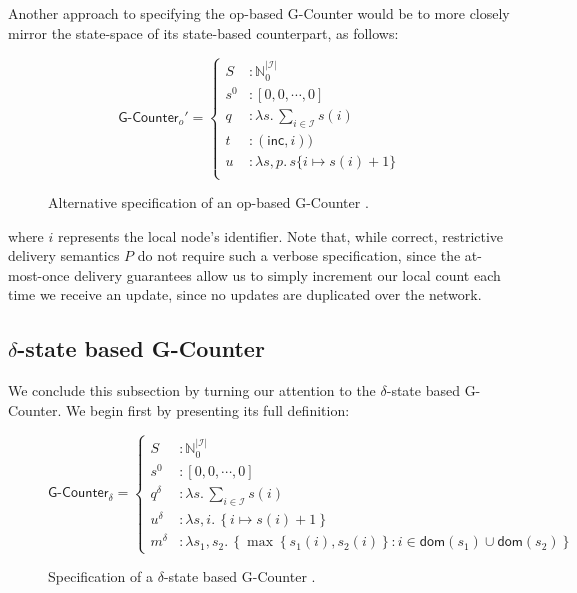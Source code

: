 Another approach to specifying the op-based G-Counter \CRDT would be to more
closely mirror the state-space of its state-based counterpart, as follows:

\begin{figure}[H]
  \centering
  \[
    \textsf{G-Counter}_o' = \left\{\begin{aligned}
      S &: \mathbb{N}_0^{|\mathcal{I}|} \\
      s^0 &: [ 0, 0, \cdots, 0 ] \\
      q &: \lambda s.\, \sum_{i \in \mathcal{I}} s(i) \\
      t &: (\textsf{inc}, i)) \\
      u &: \lambda s,p.\, s\{ i \mapsto s(i) + 1 \} \\
    \end{aligned}\right.
  \]
  \caption{Alternative specification of an op-based \textsf{G-Counter} \CRDT.}
\end{figure}

where $i$ represents the local node's identifier. Note that, while correct,
restrictive delivery semantics $P$ do not require such a verbose specification,
since the at-most-once delivery guarantees allow us to simply increment our
local count each time we receive an update, since no updates are duplicated over
the network.

\subsection{$\delta$-state based G-Counter}
We conclude this subsection by turning our attention to the $\delta$-state based
G-Counter. We begin first by presenting its full definition:

\begin{figure}[H]
  \centering
  \[
    \textsf{G-Counter}_\delta = \left\{\begin{aligned}
      S &: \mathbb{N}_0^{|\mathcal{I}|} \\
      s^0 &: \left[ 0, 0, \cdots, 0 \right] \\
      q^\delta &: \lambda s.\, \sum_{i \in \mathcal{I}} s(i) \\
      u^\delta &: \lambda s,i.\, \left\{ i \mapsto s(i) + 1 \right\} \\
      m^\delta &: \lambda s_1, s_2.\, \left\{ \max\left\{ s_1(i), s_2(i) \right\}: i \in \mathsf{dom}(s_1) \cup
      \mathsf{dom}(s_2) \right\}
    \end{aligned}\right.
  \]
  \caption{Specification of a $\delta$-state based \textsf{G-Counter} \CRDT.}
\end{figure}

